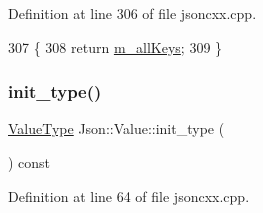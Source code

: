 Definition at line 306 of file jsoncxx.\+cpp.


\begin{DoxyCode}
307     \{
308         \textcolor{keywordflow}{return} \hyperlink{class_json_1_1_value_a914e4896d12ffa87726125d2f60ea9c0}{m\_allKeys};
309     \}
\end{DoxyCode}
\mbox{\label{class_json_1_1_value_ad24bf765750e8ea535d28bcf981d551a}} 
\subsubsection{\texorpdfstring{init\+\_\+type()}{init\_type()}}
{\footnotesize\ttfamily \hyperlink{namespace_json_a7d654b75c16a57007925868e38212b4e}{Value\+Type} Json\+::\+Value\+::init\+\_\+type (\begin{DoxyParamCaption}{ }\end{DoxyParamCaption}) const\hspace{0.3cm}{\ttfamily [protected]}}



Definition at line 64 of file jsoncxx.\+cpp.


